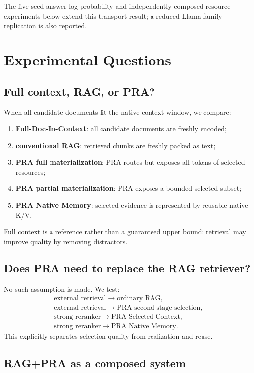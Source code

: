 \documentclass[11pt]{article}
\begin{document}
The five-seed answer-log-probability and independently composed-resource
experiments below extend this transport result; a reduced Llama-family
replication is also reported.

\FloatBarrier

\section{Experimental Questions}

\subsection{Full context, RAG, or PRA?}
When all candidate documents fit the native context window, we compare:
\begin{enumerate}[leftmargin=*]
    \item \textbf{Full-Doc-In-Context}: all candidate documents are freshly encoded;
    \item \textbf{conventional RAG}: retrieved chunks are freshly packed as text;
    \item \textbf{PRA full materialization}: PRA routes but exposes all tokens of selected resources;
    \item \textbf{PRA partial materialization}: PRA exposes a bounded selected subset;
    \item \textbf{PRA Native Memory}: selected evidence is represented by reusable native K/V.
\end{enumerate}
Full context is a reference rather than a guaranteed upper bound: retrieval may improve quality by removing distractors.

\subsection{Does PRA need to replace the RAG retriever?}
No such assumption is made.  We test:
\[
\begin{array}{l}
\text{external retrieval} \rightarrow \text{ordinary RAG},\\
\text{external retrieval} \rightarrow \text{PRA second-stage selection},\\
\text{strong reranker} \rightarrow \text{PRA Selected Context},\\
\text{strong reranker} \rightarrow \text{PRA Native Memory}.
\end{array}
\]
This explicitly separates selection quality from realization and reuse.

\subsection{RAG+PRA as a composed system}
\label{sec:rag-pra-design}
\end{document}

